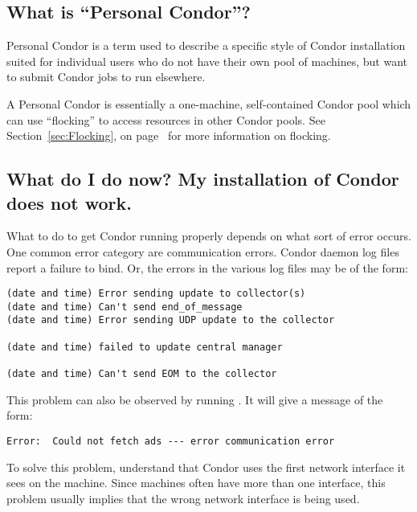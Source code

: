 
\subsection{What is ``Personal Condor''?}

Personal Condor is a term used to describe a specific style of Condor
installation suited for individual users who do not have their own
pool of machines, but want to submit Condor jobs to run elsewhere.

A Personal Condor is essentially a one-machine, self-contained Condor
pool which can use ``flocking'' to access resources in other Condor
pools.
See Section~\ref{sec:Flocking}, on page~\pageref{sec:Flocking} for
more information on flocking.


\subsection{What do I do now? My installation of Condor does not work.}

What to do to get Condor running properly depends on what sort of
error occurs. 
One common error category are communication errors.
Condor daemon log files report a failure to bind.
Or, the errors in the various log files may be of the form:

\begin{verbatim}
(date and time) Error sending update to collector(s)
(date and time) Can't send end_of_message
(date and time) Error sending UDP update to the collector

(date and time) failed to update central manager

(date and time) Can't send EOM to the collector
\end{verbatim}

This problem can also be observed by running .
It will give a message of the form:
\begin{verbatim}
Error:  Could not fetch ads --- error communication error
\end{verbatim}

To solve this problem, understand that
Condor uses the first network interface it sees on the machine.
Since machines often have more than one interface,
this problem usually implies that the wrong network
interface is being used.

